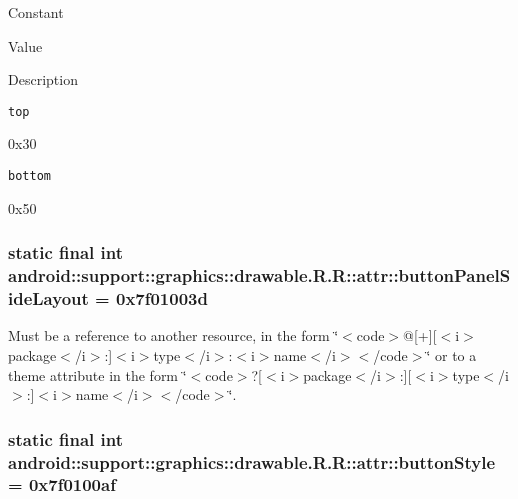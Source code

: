 Constant

Value

Description 

{\tt top}

0x30

{\tt bottom}

0x50\hypertarget{classandroid_1_1support_1_1graphics_1_1drawable_1_1_r_1_1attr_46acaf0b137e8348f7e5b8a422e40ade}{
\subsubsection[{buttonPanelSideLayout}]{\setlength{\rightskip}{0pt plus 5cm}static final int android::support::graphics::drawable.R.R::attr::buttonPanelSideLayout = 0x7f01003d}}
\label{classandroid_1_1support_1_1graphics_1_1drawable_1_1_r_1_1attr_46acaf0b137e8348f7e5b8a422e40ade}


Must be a reference to another resource, in the form \char`\"{}$<$code$>$@\mbox{[}+\mbox{]}\mbox{[}$<$i$>$package$<$/i$>$:\mbox{]}$<$i$>$type$<$/i$>$:$<$i$>$name$<$/i$>$$<$/code$>$\char`\"{} or to a theme attribute in the form \char`\"{}$<$code$>$?\mbox{[}$<$i$>$package$<$/i$>$:\mbox{]}\mbox{[}$<$i$>$type$<$/i$>$:\mbox{]}$<$i$>$name$<$/i$>$$<$/code$>$\char`\"{}. \hypertarget{classandroid_1_1support_1_1graphics_1_1drawable_1_1_r_1_1attr_a7356cb50d9e8c7b2e91b4571c501056}{
\subsubsection[{buttonStyle}]{\setlength{\rightskip}{0pt plus 5cm}static final int android::support::graphics::drawable.R.R::attr::buttonStyle = 0x7f0100af}}
\label{classandroid_1_1support_1_1graphics_1_1drawable_1_1_r_1_1attr_a7356cb50d9e8c7b2e91b4571c501056}


